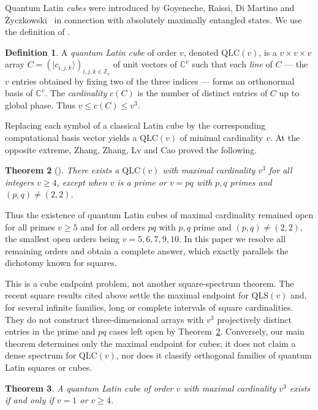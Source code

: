 \documentclass[11pt]{amsart}
\newtheorem{theorem}{Theorem}[section]
\theoremstyle{definition}
\newtheorem{definition}[theorem]{Definition}
\newcommand{\C}{\mathbb{C}}
\newcommand{\Z}{\mathbb{Z}}
\newcommand{\ket}[1]{|#1\rangle}
\newcommand{\QLS}{\mathrm{QLS}}
\newcommand{\QLC}{\mathrm{QLC}}
\begin{document}
Quantum Latin \emph{cubes} were introduced by Goyeneche, Raissi, Di Martino
and \.Zyczkowski~\cite{Goyeneche2018} in connection with absolutely
maximally entangled states.  We use the definition of
\cite[Def.~1.2]{ZZLC2026}.

\begin{definition}\label{def:qlc}
A \emph{quantum Latin cube} of order $v$, denoted $\QLC(v)$, is a $v\times
v\times v$ array $C=(\ket{c_{i,j,k}})_{i,j,k\in\Z_v}$ of unit vectors of
$\C^v$ such that each \emph{line} of $C$ --- the $v$ entries obtained by
fixing two of the three indices --- forms an orthonormal basis of $\C^v$.
The \emph{cardinality} $c(C)$ is the number of distinct entries of $C$ up to
global phase.  Thus $v\le c(C)\le v^3$.
\end{definition}

Replacing each symbol of a classical Latin cube by the corresponding
computational basis vector yields a $\QLC(v)$ of minimal cardinality $v$.
At the opposite extreme, Zhang, Zhang, Lv and Cao proved the following.

\begin{theorem}[{\cite[Thm.~1.3]{ZZLC2026}}]\label{thm:zzlc}
There exists a $\QLC(v)$ with maximal cardinality $v^3$ for all integers
$v\ge4$, except when $v$ is a prime or $v=pq$ with $p,q$ primes and
$(p,q)\ne(2,2)$.
\end{theorem}

Thus the existence of quantum Latin cubes of maximal cardinality remained
open for all primes $v\ge5$ and for all orders $pq$ with $p,q$ prime and
$(p,q)\ne(2,2)$, the smallest open orders being $v=5,6,7,9,10$.  In this paper we
resolve all remaining orders and obtain a complete answer, which exactly
parallels the dichotomy known for squares.

This is a cube endpoint problem, not another square-spectrum theorem.  The
recent square results cited above settle the maximal endpoint for
$\QLS(v)$ and, for several infinite families, long or complete intervals of
square cardinalities.  They do not construct three-dimensional arrays with
$v^3$ projectively distinct entries in the prime and $pq$ cases left open by
Theorem~\ref{thm:zzlc}.  Conversely, our main theorem determines only the
maximal endpoint for cubes; it does not claim a dense spectrum for
$\QLC(v)$, nor does it classify orthogonal families of quantum Latin squares
or cubes.

\begin{theorem}\label{thm:main}
A quantum Latin cube of order $v$ with maximal cardinality $v^3$ exists if
and only if $v=1$ or $v\ge4$.
\end{theorem}
\end{document}
